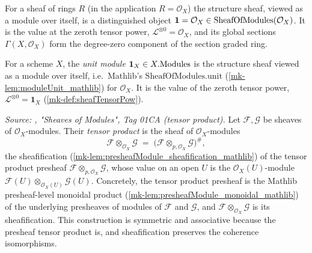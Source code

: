 \begin{lemma}
  \label{mk-lem:moduleUnit_mathlib}
  \mathlibok

  For a sheaf of rings \(R\) (in the application \(R = \mathcal{O}_X\)) the
  structure sheaf, viewed as a module over itself, is a distinguished object
  \(\mathbf{1} = \mathcal{O}_X \in \mathrm{SheafOfModules}(\mathcal{O}_X)\). It is the value at
  the zeroth tensor power, \(\mathcal{L}^{\otimes 0} = \mathcal{O}_X\), and its
  global sections \(\Gamma(X, \mathcal{O}_X)\) form the degree-zero component of
  the section graded ring.
\end{lemma}


\begin{definition}\label{mk-def:unitModule}
  \leanok

  For a scheme \(X\), the \emph{unit module} \(\mathbf{1}_X \in X.\mathrm{Modules}\) is the
  structure sheaf viewed as a module over itself, i.e.\ Mathlib's
  \(\mathrm{SheafOfModules.unit}\) (\ref{mk-lem:moduleUnit_mathlib}) for
  \(\mathcal{O}_X\). It is the value of the zeroth tensor power,
  \(\mathcal{L}^{\otimes 0} = \mathbf{1}_X\) (\ref{mk-def:sheafTensorPow}).
\end{definition}

\begin{definition}\label{mk-def:sheafTensorObj}
  \leanok

  \textit{Source: \cite{stacks-project}, "Sheaves of Modules", Tag 01CA (tensor
  product).}
  Let \(\mathcal{F}, \mathcal{G}\) be sheaves of \(\mathcal{O}_X\)-modules. Their
  \emph{tensor product} is the sheaf of \(\mathcal{O}_X\)-modules
  \[
    \mathcal{F} \otimes_{\mathcal{O}_X} \mathcal{G}
      \;=\; \bigl(\mathcal{F} \otimes_{p,\mathcal{O}_X} \mathcal{G}\bigr)^{\#},
  \]
  the sheafification (\ref{mk-lem:presheafModule_sheafification_mathlib}) of the
  tensor product presheaf \(\mathcal{F} \otimes_{p,\mathcal{O}_X} \mathcal{G}\),
  whose value on an open \(U\) is the \(\mathcal{O}_X(U)\)-module
  \(\mathcal{F}(U) \otimes_{\mathcal{O}_X(U)} \mathcal{G}(U)\). Concretely, the
  tensor product presheaf is the Mathlib presheaf-level monoidal product
  (\ref{mk-lem:presheafModule_monoidal_mathlib}) of the underlying presheaves of
  modules of \(\mathcal{F}\) and \(\mathcal{G}\), and
  \(\mathcal{F} \otimes_{\mathcal{O}_X} \mathcal{G}\) is its sheafification. This
  construction is symmetric and associative because the presheaf tensor product
  is, and sheafification preserves the coherence isomorphisms.
\end{definition}

